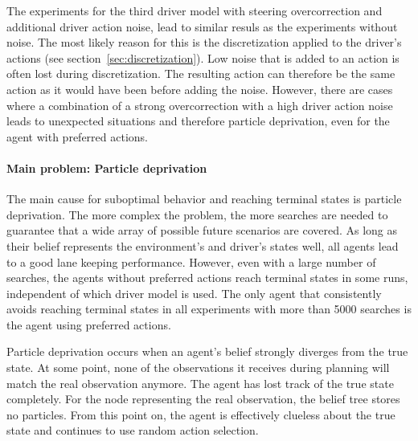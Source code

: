 The experiments for the third driver model with steering overcorrection and additional driver action noise, lead to similar resuls as the experiments without noise. The most likely reason for this is the discretization applied to the driver's actions (see section~\ref{sec:discretization}). Low noise that is added to an action is often lost during discretization. The resulting action can therefore be the same action as it would have been before adding the noise. However, there are cases where a combination of a strong overcorrection with a high driver action noise leads to unexpected situations and therefore particle deprivation, even for the agent with preferred actions.



\paragraph{Main problem: Particle deprivation}

The main cause for suboptimal behavior and reaching terminal states is particle deprivation. The more complex the problem, the more searches are needed to guarantee that a wide array of possible future scenarios are covered. As long as their belief represents the environment's and driver's states well, all agents lead to a good lane keeping performance. However, even with a large number of searches, the agents without preferred actions reach terminal states in some runs, independent of which driver model is used. The only agent that consistently avoids reaching terminal states in all experiments with more than 5000 searches is the agent using preferred actions. 

Particle deprivation occurs when an agent's belief strongly diverges from the true state. At some point, none of the observations it receives during planning will match the real observation anymore. The agent has lost track of the true state completely. For the node representing the real observation, the belief tree stores no particles. From this point on, the agent is effectively clueless about the true state and continues to use random action selection.

